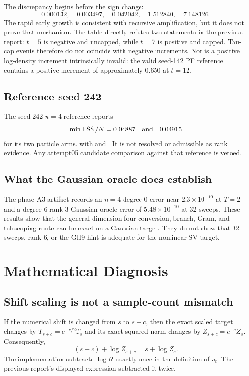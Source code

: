 \documentclass[11pt]{article}
\DeclareMathOperator{\ESS}{ESS}
\begin{document}
The discrepancy begins before the sign change:
\[
0.000132,\quad0.003497,\quad0.042042,\quad1.512840,\quad7.148126.
\]
The rapid early growth is consistent with recursive amplification, but it does
not prove that mechanism. The table directly refutes two statements in the
previous report: $t=5$ is negative and uncapped, while $t=7$ is positive and
capped. Tau-cap events therefore do not coincide with negative increments.
Nor is a positive log-density increment intrinsically invalid: the valid
seed-142 PF reference contains a positive increment of approximately $0.650$
at $t=12$.

\subsection{Reference seed 242}

The seed-242 $n=4$ reference reports
\[
\min\ESS/N=0.04887\quad\hbox{and}\quad0.04915
\]
for its two particle arms, with  and
. It is not resolved or admissible as rank evidence. Any
attempt05 candidate comparison against that reference is vetoed.

\subsection{What the Gaussian oracle does establish}

The phase-A3 artifact records an $n=4$ degree-0 error near
$2.3\times10^{-10}$ at $T=2$ and a degree-6 rank-3 Gaussian-oracle error of
$5.48\times10^{-10}$ at 32 sweeps. These results show that the general
dimension-four conversion, branch, Gram, and telescoping route can be exact on
a Gaussian target. They do not show that 32 sweeps, rank 6, or the GH9 hint
is adequate for the nonlinear SV target.

\section{Mathematical Diagnosis}

\subsection{Shift scaling is not a sample-count mismatch}

If the numerical shift is changed from $s$ to $s+c$, then the exact scaled
target changes by $T_{s+c}=e^{-c/2}T_s$ and its exact squared norm changes by
$Z_{s+c}=e^{-c}Z_s$. Consequently,
\begin{equation}\label{eq:shift-invariance}
(s+c)+\log Z_{s+c}=s+\log Z_s.
\end{equation}
The implementation subtracts $\log R$ exactly once in the definition of
$s_t$. The previous report's displayed expression subtracted it twice.
\end{document}
